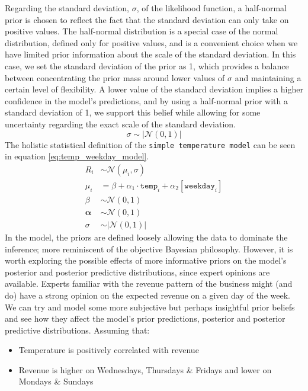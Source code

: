 Regarding the standard deviation, $\sigma$, of the likelihood function, a
half-normal prior is chosen to reflect the fact that the standard deviation can
only take on positive values. The half-normal distribution is a special case of
the normal distribution, defined only for positive values, and is a convenient
choice when we have limited prior information about the scale of the standard
deviation. In this case, we set the standard deviation of the prior as 1, which
provides a balance between concentrating the prior mass around lower values of
$\sigma$ and maintaining a certain level of flexibility. A lower value of the
standard deviation implies a higher confidence in the model's predictions, and
by using a half-normal prior with a standard deviation of 1, we support this
belief while allowing for some uncertainty regarding the exact scale of the
standard deviation.
\begin{equation}
  \label{eq:simple_temp_sigma_prior}
  \sigma \sim \left| \mathcal{N}(0,1) \right|
\end{equation}
The holistic statistical definition of the \texttt{simple temperature model} can be seen in 
equation \ref{eq:temp_weekday_model}.
\begin{equation}
  \label{eq:temp_weekday_model}
  \begin{split}
    R_i &\sim \mathcal{N}(\mu_i, \sigma) \\
    \mu_i &= \beta + \alpha_1 \cdot \texttt{temp}_i + \alpha_2[\texttt{weekday}_i] \\
    \beta &\sim \mathcal{N}(0, 1) \\
    \boldsymbol{\alpha} &\sim \mathcal{N}(0, 1) \\
    \sigma &\sim \left| \mathcal{N}(0,1) \right|
  \end{split}
\end{equation}
In the model, the priors are defined loosely allowing the data to
dominate the inference; more reminiscent of the objective Bayesian philosophy.
However, it is worth exploring the possible effects of more informative priors
on the model's posterior and posterior predictive distributions, since expert
opinions are available.
Experts familiar with the revenue pattern of the business might (and do) have a strong 
opinion on the expected revenue on a given day of the week. We can try and model 
some more subjective but perhaps insightful prior beliefs and see how they affect the model's 
prior predictions, posterior and posterior predictive distributions. Assuming that:
\begin{itemize}
\item Temperature is positively correlated with revenue 
\item Revenue is higher on Wednesdays, Thursdays \& Fridays and lower on Mondays \& Sundays
\end{itemize}
